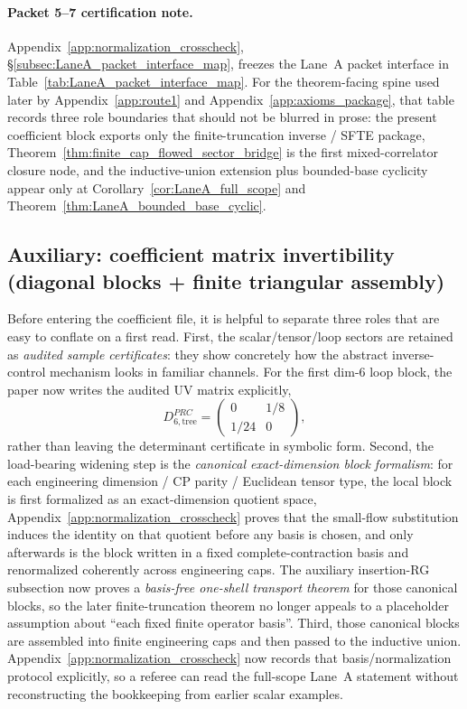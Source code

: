 \paragraph{Packet 5--7 certification note.}
Appendix~\ref{app:normalization_crosscheck}, \S\ref{subsec:LaneA_packet_interface_map}, freezes the Lane~A packet interface in Table~\ref{tab:LaneA_packet_interface_map}.
For the theorem-facing spine used later by Appendix~\ref{app:route1} and Appendix~\ref{app:axioms_package}, that table records three role boundaries that should not be blurred in prose: the present coefficient block exports only the finite-truncation inverse / SFTE package, Theorem~\ref{thm:finite_cap_flowed_sector_bridge} is the first mixed-correlator closure node, and the inductive-union extension plus bounded-base cyclicity appear only at Corollary~\ref{cor:LaneA_full_scope} and Theorem~\ref{thm:LaneA_bounded_base_cyclic}.

\subsection{Auxiliary: coefficient matrix invertibility (diagonal blocks + finite triangular assembly)}
Before entering the coefficient file, it is helpful to separate three roles that are easy to conflate on a first read.
First, the scalar/tensor/loop sectors are retained as \emph{audited sample certificates}: they show concretely how the abstract inverse-control mechanism looks in familiar channels.
For the first dim-$6$ loop block, the paper now writes the audited UV matrix explicitly,
\[
D_{6,\mathrm{tree}}^{PRC}=
\begin{pmatrix}
0&1/8\\[0.15em]
1/24&0
\end{pmatrix},
\]
rather than leaving the determinant certificate in symbolic form.
Second, the load-bearing widening step is the \emph{canonical exact-dimension block formalism}:
for each engineering dimension / CP parity / Euclidean tensor type, the local block is first formalized as an exact-dimension quotient space,
Appendix~\ref{app:normalization_crosscheck} proves that the small-flow substitution induces the identity on that quotient before any basis is chosen,
and only afterwards is the block written in a fixed complete-contraction basis and renormalized coherently across engineering caps.
The auxiliary insertion-RG subsection now proves a \emph{basis-free one-shell transport theorem} for those canonical blocks,
so the later finite-truncation theorem no longer appeals to a placeholder assumption about ``each fixed finite operator basis''.
Third, those canonical blocks are assembled into finite engineering caps and then passed to the inductive union.
Appendix~\ref{app:normalization_crosscheck} now records that basis/normalization protocol explicitly, so a referee can read the full-scope Lane~A statement without reconstructing the bookkeeping from earlier scalar examples.


